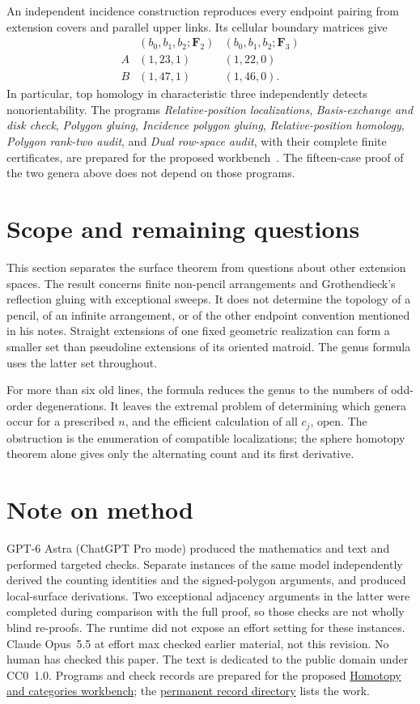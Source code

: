 \documentclass[11pt]{article}
\theoremstyle{definition}\newtheorem{definition}[theorem]{Definition}
\newcommand{\workbenchurl}{https://github.com/KokunoYumeto/homotopy-and-categories-workbench}
\newcommand{\recordurl}{https://github.com/KokunoYumeto/mathematics-workbenches}
\begin{document}
An independent incidence construction reproduces every endpoint pairing
from extension covers and parallel upper links. Its cellular boundary
matrices give
\[
\begin{array}{c|cc}
 & (b_0,b_1,b_2;\mathbf F_2)&(b_0,b_1,b_2;\mathbf F_3)\\\hline
 A&(1,23,1)&(1,22,0)\\
 B&(1,47,1)&(1,46,0).
\end{array}
\]
In particular, top homology in characteristic three independently
detects nonorientability. The programs \emph{Relative-position
localizations}, \emph{Basis-exchange and disk check}, \emph{Polygon
gluing}, \emph{Incidence polygon gluing}, \emph{Relative-position homology},
\emph{Polygon rank-two audit},
and \emph{Dual row-space audit}, with their complete
finite certificates, are prepared for the proposed
workbench~\cite{Workbench}.
The fifteen-case proof of the two genera above does not depend on
those programs.




\section{Scope and remaining questions}
This section separates the surface theorem from questions about other
extension spaces. The result concerns finite non-pencil arrangements
and Grothendieck's reflection gluing with exceptional sweeps. It does
not determine the topology of a pencil, of an infinite arrangement,
or of the other endpoint convention mentioned in his notes.
Straight extensions of one fixed geometric realization can form a
smaller set than pseudoline extensions of its oriented matroid.
The genus formula uses the latter set throughout.

For more than six old lines, the formula reduces the genus to the
numbers of odd-order degenerations. It leaves the extremal problem
of determining which genera occur for a prescribed $n$, and the
efficient calculation of all $c_j$, open. The obstruction is the
enumeration of compatible localizations; the sphere homotopy theorem
alone gives only the alternating count and its first derivative.

\section*{Note on method}
\begingroup\small
GPT-6 Astra (ChatGPT Pro mode) produced the mathematics and text
and performed targeted checks. Separate instances of the same model
independently derived the counting identities and the signed-polygon
arguments, and produced local-surface derivations. Two exceptional
adjacency arguments in the latter were completed during comparison
with the full proof, so those checks are not wholly blind re-proofs.
The runtime did not expose an effort setting for these instances.
Claude Opus~5.5 at effort max checked earlier material, not this
revision. No human has checked this paper.
The text is dedicated to the public domain under CC0~1.0.
Programs and check records are prepared for the proposed
\href{\workbenchurl}{Homotopy and categories workbench}; the
\href{\recordurl}{permanent record directory} lists the work.
\end{document}
